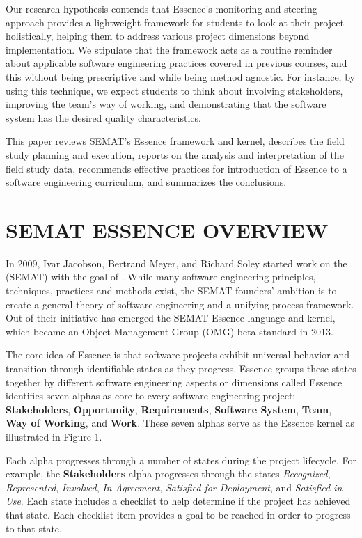 Our research hypothesis contends that Essence's monitoring and steering approach provides a lightweight framework for students to look at their project holistically, helping them to address various project dimensions beyond implementation. We stipulate that the framework acts as a routine reminder about applicable software engineering practices covered in previous courses, and this without being prescriptive and while being method agnostic. For instance, by using this technique, we expect students to think about involving stakeholders, improving the team's way of working, and demonstrating that the software system has the desired quality characteristics.

This paper reviews SEMAT's Essence framework and kernel, describes the field study planning and execution, reports on the analysis and interpretation of the field study data, recommends effective practices for introduction of Essence to a software engineering curriculum, and summarizes the conclusions.

\section{SEMAT ESSENCE OVERVIEW}
In 2009, Ivar Jacobson, Bertrand Meyer, and Richard Soley started work on the  (SEMAT) with the goal of  \cite{JacobsonCallForAction}. While many software engineering principles, techniques, practices and methods exist, the SEMAT founders' ambition is to create a general theory of software engineering and a unifying process framework. Out of their initiative has emerged the SEMAT Essence language and kernel, which became an Object Management Group (OMG) beta standard in 2013.

The core idea of Essence is that software projects exhibit universal behavior and transition through identifiable states as they progress. Essence groups these states together by different software engineering aspects or dimensions called  Essence identifies seven alphas as core to every software engineering project: \textbf{Stakeholders}, \textbf{Opportunity}, \textbf{Requirements}, \textbf{Software System}, \textbf{Team}, \textbf{Way of Working}, and \textbf{Work}. These seven alphas serve as the Essence kernel as illustrated in Figure 1.

Each alpha progresses through a number of states during the project lifecycle. For example, the \textbf{Stakeholders} alpha progresses through the states \textit{Recognized}, \textit{Represented}, \textit{Involved}, \textit{In Agreement}, \textit{Satisfied for Deployment}, and \textit{Satisfied in Use}. Each state includes a checklist to help determine if the project has achieved that state. Each checklist item provides a goal to be reached in order to progress to that state.

